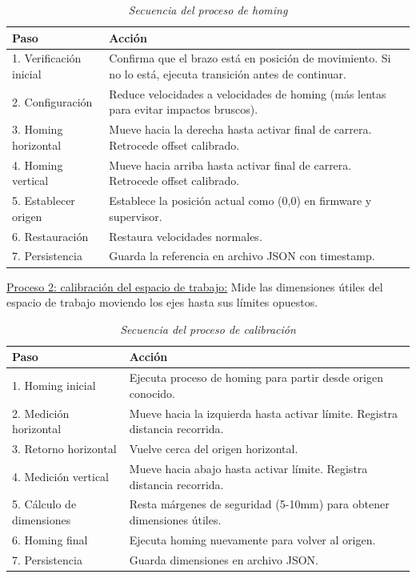 \begin{table}[H]
\centering
\small
\begin{tabular}{|l|p{10cm}|}
\hline
Paso & Acción \\
\hline
1. Verificación inicial & Confirma que el brazo está en posición de movimiento. Si no lo está, ejecuta transición antes de continuar. \\
\hline
2. Configuración & Reduce velocidades a velocidades de homing (más lentas para evitar impactos bruscos). \\
\hline
3. Homing horizontal & Mueve hacia la derecha hasta activar final de carrera. Retrocede offset calibrado. \\
\hline
4. Homing vertical & Mueve hacia arriba hasta activar final de carrera. Retrocede offset calibrado. \\
\hline
5. Establecer origen & Establece la posición actual como (0,0) en firmware y supervisor. \\
\hline
6. Restauración & Restaura velocidades normales. \\
\hline
7. Persistencia & Guarda la referencia en archivo JSON con timestamp. \\
\hline
\end{tabular}
\caption{\textit{Secuencia del proceso de homing}}
\label{tab:proceso_homing}
\end{table}

\underline{Proceso 2: calibración del espacio de trabajo:} Mide las dimensiones útiles del espacio de trabajo moviendo los ejes hasta sus límites opuestos.

\begin{table}[H]
\centering
\small
\begin{tabular}{|l|p{10cm}|}
\hline
Paso & Acción \\
\hline
1. Homing inicial & Ejecuta proceso de homing para partir desde origen conocido. \\
\hline
2. Medición horizontal & Mueve hacia la izquierda hasta activar límite. Registra distancia recorrida. \\
\hline
3. Retorno horizontal & Vuelve cerca del origen horizontal. \\
\hline
4. Medición vertical & Mueve hacia abajo hasta activar límite. Registra distancia recorrida. \\
\hline
5. Cálculo de dimensiones & Resta márgenes de seguridad (5-10mm) para obtener dimensiones útiles. \\
\hline
6. Homing final & Ejecuta homing nuevamente para volver al origen. \\
\hline
7. Persistencia & Guarda dimensiones en archivo JSON. \\
\hline
\end{tabular}
\caption{\textit{Secuencia del proceso de calibración}}
\label{tab:proceso_calibracion}
\end{table}

